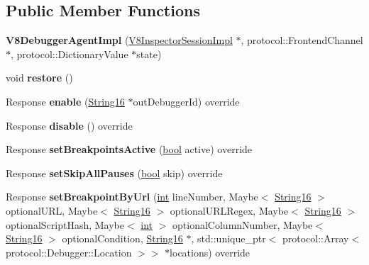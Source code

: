 \subsection*{Public Member Functions}
\begin{DoxyCompactItemize}
\item 
\mbox{\label{classv8__inspector_1_1V8DebuggerAgentImpl_ab7a25af8d84d07de5e356947bf8e7f22}} 
{\bfseries V8\+Debugger\+Agent\+Impl} (\mbox{\hyperlink{classv8__inspector_1_1V8InspectorSessionImpl}{V8\+Inspector\+Session\+Impl}} $\ast$, protocol\+::\+Frontend\+Channel $\ast$, protocol\+::\+Dictionary\+Value $\ast$state)
\item 
\mbox{\label{classv8__inspector_1_1V8DebuggerAgentImpl_a246ec21354eb1ac1ba7e6ee09bea33df}} 
void {\bfseries restore} ()
\item 
\mbox{\label{classv8__inspector_1_1V8DebuggerAgentImpl_abe508cf5e7d74d7ed7cdca3352e7743c}} 
Response {\bfseries enable} (\mbox{\hyperlink{classv8__inspector_1_1String16}{String16}} $\ast$out\+Debugger\+Id) override
\item 
\mbox{\label{classv8__inspector_1_1V8DebuggerAgentImpl_a15268ed61262e630ad50630ad4df2fc3}} 
Response {\bfseries disable} () override
\item 
\mbox{\label{classv8__inspector_1_1V8DebuggerAgentImpl_a5e5d082b165218019b16b35152acb758}} 
Response {\bfseries set\+Breakpoints\+Active} (\mbox{\hyperlink{classbool}{bool}} active) override
\item 
\mbox{\label{classv8__inspector_1_1V8DebuggerAgentImpl_a0d160fef78890390eb7f663e030de0d8}} 
Response {\bfseries set\+Skip\+All\+Pauses} (\mbox{\hyperlink{classbool}{bool}} skip) override
\item 
\mbox{\label{classv8__inspector_1_1V8DebuggerAgentImpl_a343b38d237399dc816cdbe2fd70ff925}} 
Response {\bfseries set\+Breakpoint\+By\+Url} (\mbox{\hyperlink{classint}{int}} line\+Number, Maybe$<$ \mbox{\hyperlink{classv8__inspector_1_1String16}{String16}} $>$ optional\+U\+RL, Maybe$<$ \mbox{\hyperlink{classv8__inspector_1_1String16}{String16}} $>$ optional\+U\+R\+L\+Regex, Maybe$<$ \mbox{\hyperlink{classv8__inspector_1_1String16}{String16}} $>$ optional\+Script\+Hash, Maybe$<$ \mbox{\hyperlink{classint}{int}} $>$ optional\+Column\+Number, Maybe$<$ \mbox{\hyperlink{classv8__inspector_1_1String16}{String16}} $>$ optional\+Condition, \mbox{\hyperlink{classv8__inspector_1_1String16}{String16}} $\ast$, std\+::unique\+\_\+ptr$<$ protocol\+::\+Array$<$ protocol\+::\+Debugger\+::\+Location $>$$>$ $\ast$locations) override
$$
\end{DoxyCompactItemize}
